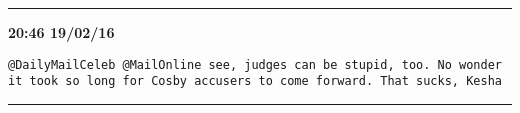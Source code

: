 \hrule%

\begin{adjustwidth}{2cm}{0cm}
\footnotesize \textbf{20:46 19/02/16}

\begin{lstlisting}[breaklines, breakatwhitespace, basicstyle=\small, frame=leftline]
@DailyMailCeleb @MailOnline see, judges can be stupid, too. No wonder it took so long for Cosby accusers to come forward. That sucks, Kesha
\end{lstlisting}
\end{adjustwidth}

\hrule%

